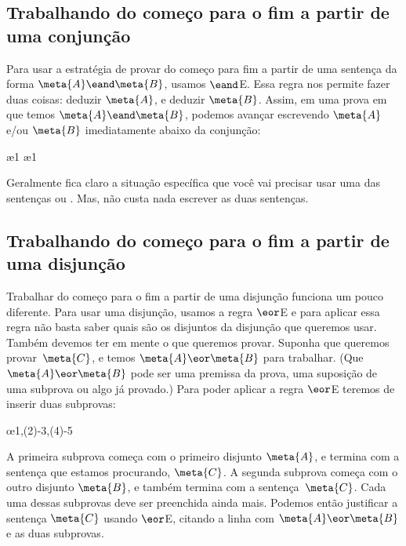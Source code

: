 \subsection*{Trabalhando do começo para o fim a partir de uma conjunção}

Para usar a estratégia de provar do  começo para fim a partir de uma sentença da forma $\meta{A} \eand \meta{B}$, usamos $\eand$E. Essa regra nos permite fazer duas coisas: deduzir $\meta{A}$, e deduzir $\meta{B}$. Assim, em uma prova em que temos $\meta{A} \eand \meta{B}$, podemos avançar escrevendo $\meta{A}$ e/ou $\meta{B}$  imediatamente abaixo da conjunção:

\begin{fitchproof}
  \ae{1}
  \ae{1}
\end{fitchproof}
Geralmente fica claro a situação específica que você vai  precisar usar uma das sentenças  ou .  Mas, não custa nada escrever as  duas sentenças. 

\subsection*{Trabalhando do começo para o fim a partir de uma disjunção}

Trabalhar do começo para o fim a partir de uma disjunção funciona um pouco diferente. Para usar uma disjunção, usamos a regra $\eor$E e para aplicar essa regra não basta saber quais são os disjuntos da disjunção que queremos usar. Também devemos ter em mente o que queremos provar. Suponha que queremos provar~$\meta{C}$,  e temos $\meta{A} \eor \meta{B}$ para trabalhar. (Que $\meta{A} \eor \meta{B}$ pode ser uma premissa da prova, uma suposição de uma subprova ou algo já provado.) Para poder aplicar a regra $\eor$E teremos de inserir duas subprovas:
 

\begin{fitchproof}
	\open
	\ellipsesline 
	\close 
	\open
	\ellipsesline
	\close
	\oe{1,(2)-3,(4)-5} 
\end{fitchproof} 
A primeira subprova começa com o primeiro disjunto $\meta{A}$, e termina com a sentença que estamos procurando, $\meta{C}$. A segunda subprova começa com o outro disjunto $\meta{B}$, e também termina com  a sentença~$\meta{C}$. Cada uma dessas subprovas deve ser preenchida ainda mais. Podemos então justificar a sentença $\meta{C}$ usando $\eor$E, citando a linha com $\meta{A} \eor \meta{B}$ e as duas subprovas.

